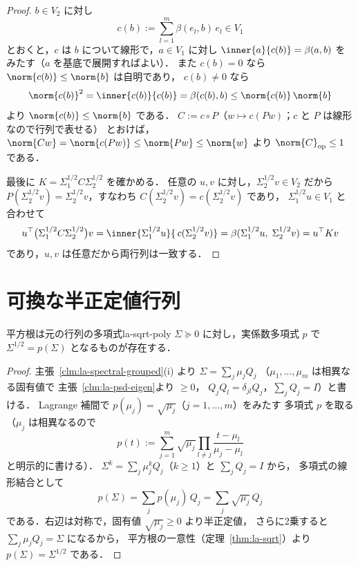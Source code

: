 \begin{proof}
  $b\in V_2$ に対し
  \[
    c(b):=\sum_{l=1}^m\beta(e_l,b)\,e_l\in V_1
  \]
  とおくと，$c$ は $b$ について線形で，$a\in V_1$ に対し
  $\inner{a}{c(b)}=\beta(a,b)$ をみたす（$a$ を基底で展開すればよい）．
  また $c(b)=0$ なら $\norm{c(b)}\leq\norm{b}$ は自明であり，
  $c(b)\neq0$ なら
  \[
    \norm{c(b)}^2=\inner{c(b)}{c(b)}=\beta(c(b),b)
    \leq\norm{c(b)}\,\norm{b}
  \]
  より $\norm{c(b)}\leq\norm{b}$ である．
  $C:=c\circ P$（$w\mapsto c(Pw)$；$c$ と $P$ は線形なので行列で表せる）
  とおけば，
  $\norm{Cw}=\norm{c(Pw)}\leq\norm{Pw}\leq\norm{w}$ より
  $\norm{C}_{\mathrm{op}}\leq1$ である．

  最後に $K=\Sigma_1^{1/2}C\Sigma_2^{1/2}$ を確かめる．
  任意の $u,v$ に対し，$\Sigma_2^{1/2}v\in V_2$ だから
  $P(\Sigma_2^{1/2}v)=\Sigma_2^{1/2}v$，すなわち
  $C(\Sigma_2^{1/2}v)=c(\Sigma_2^{1/2}v)$ であり，
  $\Sigma_1^{1/2}u\in V_1$ と合わせて
  \[
    u^\top\bigl(\Sigma_1^{1/2}C\Sigma_2^{1/2}\bigr)v
    =\inner{\Sigma_1^{1/2}u}{\,c(\Sigma_2^{1/2}v)}
    =\beta(\Sigma_1^{1/2}u,\;\Sigma_2^{1/2}v)
    =u^\top Kv
  \]
  であり，$u,v$ は任意だから両行列は一致する．
\end{proof}

\section{可換な半正定値行列}

\begin{lemma}{平方根は元の行列の多項式}{la-sqrt-poly}
  $\Sigma\succeq0$ に対し，実係数多項式 $p$ で
  $\Sigma^{1/2}=p(\Sigma)$ となるものが存在する．
\end{lemma}

\begin{proof}
  主張~\ref{clm:la-spectral-grouped}(i) より
  $\Sigma=\sum_j\mu_jQ_j$
  （$\mu_1,\dots,\mu_m$ は相異なる固有値で
  主張~\ref{clm:la-psd-eigen}より $\geq0$，
  $Q_jQ_l=\delta_{jl}Q_j$，$\sum_jQ_j=I$）と書ける．
  Lagrange 補間で $p(\mu_j)=\sqrt{\mu_j}$（$j=1,\dots,m$）をみたす
  多項式 $p$ を取る（$\mu_j$ は相異なるので
  \[
    p(t):=\sum_{j=1}^m\sqrt{\mu_j}\prod_{l\neq j}\frac{t-\mu_l}{\mu_j-\mu_l}
  \]
  と明示的に書ける）．
  $\Sigma^k=\sum_j\mu_j^kQ_j$（$k\geq1$）と $\sum_jQ_j=I$ から，
  多項式の線形結合として
  \[
    p(\Sigma)=\sum_jp(\mu_j)\,Q_j=\sum_j\sqrt{\mu_j}\,Q_j
  \]
  である．右辺は対称で，固有値 $\sqrt{\mu_j}\geq0$ より半正定値，
  さらに2乗すると $\sum_j\mu_jQ_j=\Sigma$ になるから，
  平方根の一意性（定理~\ref{thm:la-sqrt}）より
  $p(\Sigma)=\Sigma^{1/2}$ である．
\end{proof}

